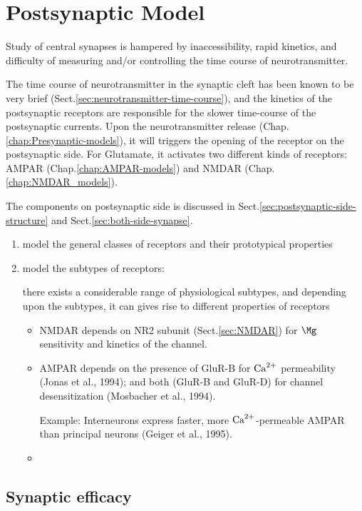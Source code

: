 \chapter{Postsynaptic Model}
\label{chap:Postsynaptic-models}

Study of central synapses is hampered by inaccessibility, rapid kinetics, and
difficulty of measuring and/or controlling the time course of neurotransmitter.

The time course of neurotransmitter in the synaptic cleft has been known to be
very brief (Sect.\ref{sec:neurotransmitter-time-course}), and the kinetics of
the postsynaptic receptors are responsible for the slower time-course of the
postsynaptic currents.  Upon the neurotransmitter release
(Chap.\ref{chap:Presynaptic-models}), it will triggers the opening of the
receptor on the postsynaptic side. For Glutamate, it activates two different
kinds of receptors: AMPAR (Chap.\ref{chap:AMPAR-models}) and NMDAR
(Chap.\ref{chap:NMDAR_models}).


The components on postsynaptic side is discussed in
Sect.\ref{sec:postsynaptic-side-structure} and Sect.\ref{sec:both-side-synapse}.

\begin{enumerate}
  \item model the general classes of receptors and their prototypical properties
  \item model the subtypes of receptors:
  
there exists a considerable range of physiological subtypes, and depending upon
the subtypes, it can gives rise to different properties of receptors
\begin{itemize}
  \item NMDAR depends on NR2 subunit (Sect.\ref{sec:NMDAR}) for $\Mg$
  sensitivity and kinetics of the channel.
  
  \item AMPAR depends on the presence of GluR-B for ${\text{Ca}^{2+}}$ permeability (Jonas
  et al., 1994); and both (GluR-B and GluR-D) for channel desensitization
  (Mosbacher et al., 1994).

Example: Interneurons express faster, more ${\text{Ca}^{2+}}$-permeable AMPAR than principal
neurons (Geiger et al., 1995).

  \item 
\end{itemize}
\end{enumerate}

\section{Synaptic efficacy}
\label{sec:synaptic-efficacy}


